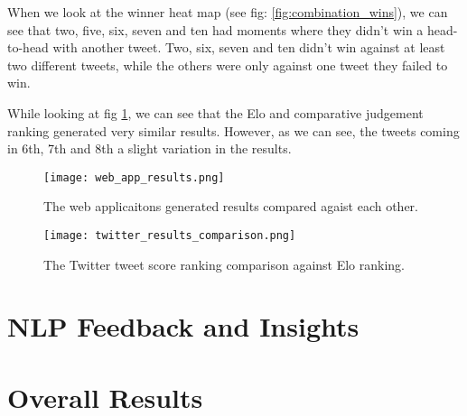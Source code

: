 When we look at the winner heat map (see fig: \ref{fig:combination_wins}), we can see that two, five, six, seven and ten had moments where they didn't win a head-to-head with another tweet. Two, six, seven and ten didn't win against at least two different tweets, while the others were only against one tweet they failed to win.


While looking at fig \ref{fig:web_app_results}, we can see that the Elo and comparative judgement ranking generated very similar results. However, as we can see, the tweets coming in 6th, 7th and 8th a slight variation in the results.

\begin{figure}[h]
	\centering
	\texttt{[image: web\_app\_results.png]}
	\caption{The web applicaitons generated results compared agaist each other.}
	\label{fig:web_app_results}
	
\end{figure}

\begin{figure}[h]
	\centering
	\texttt{[image: twitter\_results\_comparison.png]}
	\caption{The Twitter tweet score ranking comparison against Elo ranking.}
	\label{fig:twitter_results_comparison}
	
\end{figure}



\section{NLP Feedback and Insights}
\label{sec:reaults_NLP}

\section{Overall Results}
\label{sec:reaults_NLP}

